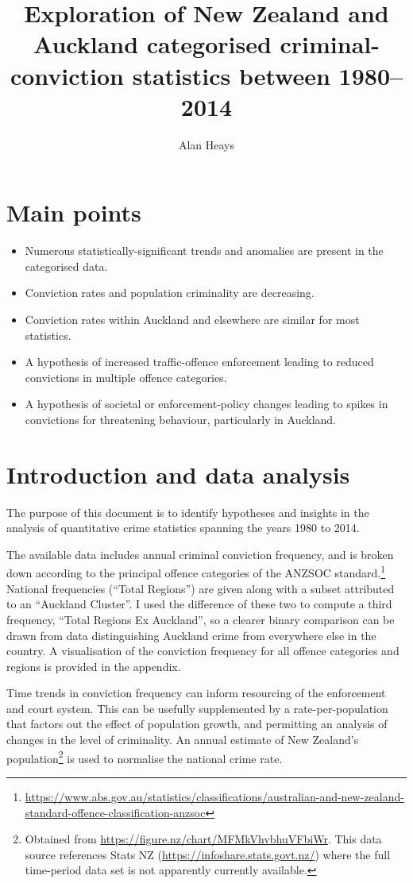 \documentclass[onecolumn]{myarticle}
\title{Exploration of New Zealand and Auckland categorised criminal-conviction statistics between 1980–2014}
\author{Alan Heays}
\begin{document}
\maketitle

\section*{Main points}
\begin{itemize}
  \item Numerous statistically-significant trends and anomalies are present in the categorised data.
  \item Conviction rates and population criminality are decreasing.
  \item Conviction rates within Auckland and elsewhere are similar for most statistics.
  \item A hypothesis of increased traffic-offence enforcement leading to reduced convictions in multiple offence categories.
  \item A hypothesis of societal or enforcement-policy changes leading to spikes in convictions for threatening behaviour, particularly in Auckland.
\end{itemize}

\section*{Introduction and data analysis}

The purpose of this document is to identify hypotheses and insights in the analysis of quantitative crime statistics spanning the years 1980 to 2014.

The available data includes annual criminal conviction frequency, and is broken down according to the principal offence categories of the ANZSOC standard.\footnote{\url{https://www.abs.gov.au/statistics/classifications/australian-and-new-zealand-standard-offence-classification-anzsoc}}
National frequencies (``Total Regions'') are given along with a subset attributed to an ``Auckland Cluster''.  
I used the difference of these two to compute a third frequency, ``Total Regions Ex Auckland'', so a clearer binary comparison can be drawn from data distinguishing Auckland crime from everywhere else in the country.
A visualisation of the conviction frequency for all offence categories and regions is provided in the appendix.

Time trends in conviction frequency can inform resourcing of the enforcement and court system.
This can be usefully supplemented by a rate-per-population that factors out the effect of population growth, and permitting an analysis of changes in the level of criminality.
An annual estimate of New Zealand's population\footnote{Obtained from \url{https://figure.nz/chart/MFMkVhvbhuVFbiWr}. This data source references Stats NZ (\url{https://infoshare.stats.govt.nz/}) where the full time-period data set is not apparently currently available.}  is used to normalise the national crime rate.
\end{document}
